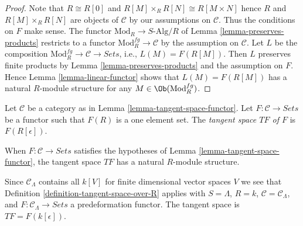 \begin{proof}
Note that $R \cong R[0]$ and $R[M] \times_R R[N] \cong R[M \times N]$ hence
$R$ and $R[M] \times_R R[N]$ are objects of $\mathcal{C}$ by our assumptions on
$\mathcal{C}$. Thus the conditions on $F$ make sense.
The functor $\text{Mod}_R \to S\text{-Alg}/R$ of
Lemma \ref{lemma-preserves-products}
restricts to a functor $\text{Mod}^{fg}_R \to \mathcal{C}$
by the assumption on $\mathcal{C}$. Let $L$ be the composition
$\text{Mod}^{fg}_R \to \mathcal{C} \to \textit{Sets}$, i.e.,
$L(M) = F(R[M])$.
Then $L$ preserves finite products by
Lemma \ref{lemma-preserves-products}
and the assumption on $F$. Hence
Lemma \ref{lemma-linear-functor}
shows that $L(M) = F(R[M])$ has a natural $R$-module structure for any
$M \in \Ob(\text{Mod}^{fg}_R)$.
\end{proof}

\begin{definition}
\label{definition-tangent-space-over-R}
Let $\mathcal{C}$ be a category as in
Lemma \ref{lemma-tangent-space-functor}.
Let $F : \mathcal{C} \to \textit{Sets}$ be a functor such that
$F(R)$ is a one element set. The {\it tangent space $TF$ of $F$} is
$F(R[\epsilon])$.
\end{definition}

\noindent
When $F : \mathcal{C} \to \textit{Sets}$ satisfies the hypotheses of
Lemma \ref{lemma-tangent-space-functor},
the tangent space $TF$ has a natural $R$-module structure.

\begin{example}
\label{example-tangent-space-functor}
Since $\mathcal{C}_\Lambda$ contains all $k[V]$ for finite dimensional
vector spaces $V$ we see that
Definition \ref{definition-tangent-space-over-R} applies with
$S = \Lambda$, $R = k$, $\mathcal{C} = \mathcal{C}_\Lambda$, and
$F : \mathcal{C}_\Lambda \to \textit{Sets}$ a
predeformation functor. The tangent space is $TF = F(k[\epsilon])$.
\end{example}

